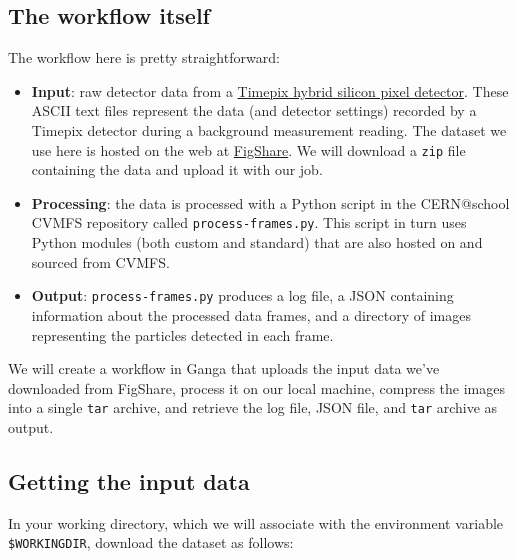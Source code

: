 \subsection{The workflow itself}
\label{the-workflow-itself}
The workflow here is pretty straightforward:

\begin{itemize}
\tightlist
\item \textbf{Input}: raw
detector data from a \href{http://medipix.web.cern.ch}{Timepix hybrid
silicon pixel detector}. These ASCII text files represent the data (and
detector settings) recorded by a Timepix detector during a background
measurement reading. The dataset we use here is hosted on the web at
\href{http://figshare.com}{FigShare}. We will download a \texttt{zip}
file containing the data and upload it with our job.
\item \textbf{Processing}: the data is processed with a Python script in the
CERN@school CVMFS repository called \texttt{process-frames.py}. This
script in turn uses Python modules (both custom and standard) that are
also hosted on and sourced from CVMFS.
\item \textbf{Output}:
\texttt{process-frames.py} produces a log file, a JSON containing
information about the processed data frames, and a directory of images
representing the particles detected in each frame.
\end{itemize}

We will create a workflow in Ganga that uploads the input data we've
downloaded from FigShare, process it on our local machine, compress the
images into a single \texttt{tar} archive, and retrieve the log file,
JSON file, and \texttt{tar} archive as output.

\subsection{Getting the input data}
\label{getting-the-input-data}
In your working directory, which we will associate with the environment
variable \texttt{\$WORKINGDIR}, download the dataset as follows:

\begin{Shaded}
\begin{Highlighting}[]
\NormalTok{$ } 
\NormalTok{$ } 
\NormalTok{$ } 
\NormalTok{$ } 
\NormalTok{$ } 
\NormalTok{$ }
  
\end{Highlighting}
\end{Shaded}

